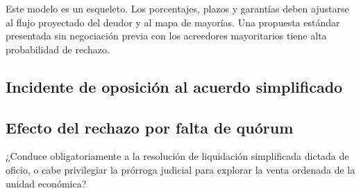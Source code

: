 \begin{alerta}
Este modelo es un esqueleto. Los porcentajes, plazos y garantías deben ajustarse al flujo
proyectado del deudor y al mapa de mayorías. Una propuesta estándar presentada sin
negociación previa con los acreedores mayoritarios tiene alta probabilidad de rechazo.
\end{alerta}

\bloqueJurisprudencial

\subsection{Incidente de oposición al acuerdo simplificado}

\subsection{Efecto del rechazo por falta de quórum}

¿Conduce obligatoriamente a la resolución de liquidación simplificada dictada de oficio,
o cabe privilegiar la prórroga judicial para explorar la venta ordenada de la unidad
económica? 
